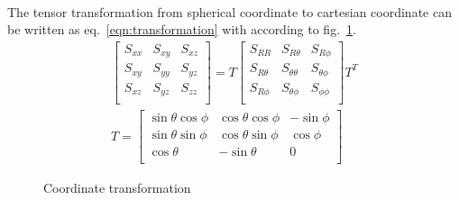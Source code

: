 \paragraph{}
The tensor transformation from spherical coordinate to cartesian coordinate can be written as eq.~\ref{eqn:transformation} with according to fig.~\ref{octree_fig:oct_ex_hollow_sphere_tran}.
\begin{subequations}
  \begin{align}
    \begin{bmatrix}
      S_{xx} & S_{xy} & S_{xz} \\
      S_{xy} & S_{yy} & S_{yz} \\
      S_{xz} & S_{yz} & S_{zz} \\
    \end{bmatrix} = T\begin{bmatrix}
      S_{RR} & S_{R\theta} & S_{R\phi} \\
      S_{R\theta} & S_{\theta\theta} & S_{\theta\phi}\\
      S_{R\phi} & S_{\theta\phi} & S_{\phi\phi} \\
    \end{bmatrix} T^T\\
  T = 
\begin{bmatrix}
\sin\theta\cos\phi & \cos\theta\cos\phi & -\sin\phi \\
\sin\theta\sin\phi & \cos\theta\sin\phi & \cos\phi  \\
\cos\theta & -\sin\theta & 0 \\
\end{bmatrix}
\end{align}
\label{eqn:transformation}
\end{subequations}

\begin{figure}[h!]
    \centering
    \caption{Coordinate transformation}
    \label{octree_fig:oct_ex_hollow_sphere_tran}
  \end{figure}
  
